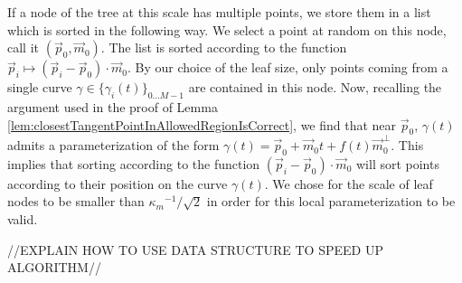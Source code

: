 \documentclass{article}
\numberwithin{cntr}{section}
\numberwithin{equation}{section}
\newcommand{\vp}[0]{{\vec{p}}}
\newcommand{\vm}[0]{{\vec{m}}}
\newcommand{\Oto}[1]{{0 \ldots #1-1}}
\newcommand{\curveSet}{{ \{ \gamma_i(t) \}_{\Oto{M}}}}
\newcommand{\curvemax}{{\kappa_{m}}}
\newcommand{\curvemaxi}{{\curvemax^{-1}}}
\begin{document}
If a node of the tree at this scale has multiple points, we store them in a list which is sorted in the following way. We select a point at random on this node, call it $(\vp_{0},\vm_{0})$. The list is sorted according to the function $\vp_{i} \mapsto (\vp_{i} - \vp_{0}) \cdot \vm_{0}$. By our choice of the leaf size, only points coming from a single curve $\gamma \in \curveSet$ are contained in this node. Now, recalling the argument used in the proof of Lemma \ref{lem:closestTangentPointInAllowedRegionIsCorrect}, we find that near $\vp_{0}$, $\gamma(t)$ admits a parameterization of the form $\gamma(t)=\vp_{0} + \vm_{0} t + f(t) \vm_{0}^{\perp}$. This implies that sorting according to the function $(\vp_{i} - \vp_{0}) \cdot \vm_{0}$ will sort points according to their position on the curve $\gamma(t)$. We chose for the scale of leaf nodes to be smaller than $\curvemaxi / \sqrt{2}$ in order for this local parameterization to be valid.

//EXPLAIN HOW TO USE DATA STRUCTURE TO SPEED UP ALGORITHM//
\end{document}
